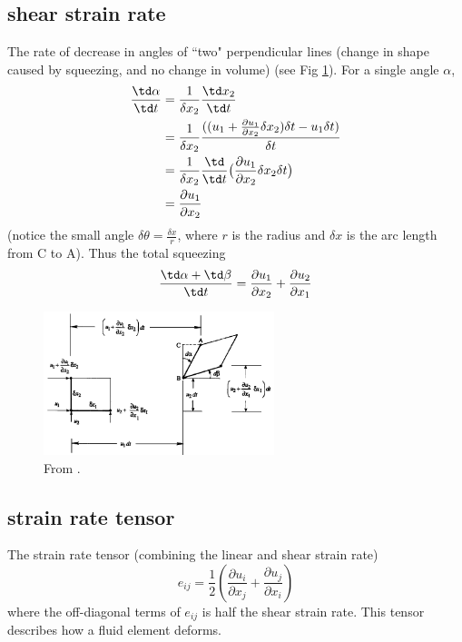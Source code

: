 \subsection{shear strain rate} 
\begin{defn*} 
The rate of decrease in angles of ``two" perpendicular lines (change in shape caused by squeezing,
and no change in volume) (see Fig \ref{fig:shearStrain}). For a single angle $\alpha$, 
\begin{equation} 
\begin{aligned} 
   \frac{\td \alpha }{\td t} 
   & = \frac{1}{\delta x_2}\frac{\td x_2}{\td t} \\ 
   & = \frac{1}{\delta x_2}\frac{((u_1 + \frac{\partial u_1}{\partial x_2}\delta x_2)\delta t - u_1
       \delta t ) }{\delta t} \\ 
   & = \frac{1}{\delta x_2}\frac{\td}{\td t}\big( \frac{\partial u_1}{\partial x_2}\delta x_2\delta t
       \big) \\ 
   & = \frac{\partial u_1}{\partial x_2} 
\end{aligned} 
\end{equation} 
(notice the small angle $\delta \theta = \frac{\delta x}{r}$, where $r$ is the radius and $\delta x$
is the arc length from C to A). Thus the total squeezing 
\begin{equation} 
  \frac{\td \alpha + \td \beta}{\td t} =
  \frac{\partial u_1}{\partial x_2} + \frac{\partial u_2}{\partial x_1} 
\end{equation} 
\end{defn*}
\begin{figure}[H] 
   \includegraphics[width=0.6\textwidth, height=0.4\textwidth]{shearStrain.png}
   \caption{\label{fig:shearStrain} From \cite{kundu2008fluid}.  } 
\end{figure}

\subsection{strain rate tensor} 
\begin{defn*} 
The strain rate tensor (combining the linear and shear strain rate) 
\begin{equation} 
   e_{ij} = \frac{1}{2}(\frac{\partial u_i}{\partial x_j }+\frac{\partial u_j}{\partial x_i }) 
\end{equation} 
where the off-diagonal terms of $e_{ij}$ is half the shear strain rate. This tensor describes how a
fluid element deforms.  
\end{defn*}


